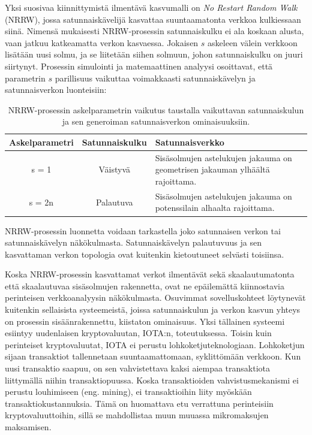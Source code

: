 \documentclass[finnish, 12pt, a4paper, sci, utf8, pdfa]{aaltothesis}
\begin{document}
Yksi suosivaa kiinnittymistä ilmentävä kasvumalli on \textit{No Restart Random Walk} (NRRW), jossa satunnaiskävelijä kasvattaa suuntaamatonta verkkoa kulkiessaan siinä. Nimensä 
mukaisesti NRRW-prosessin satunnaiskulku ei ala koskaan alusta, vaan jatkuu katkeamatta verkon kasvaessa. Jokaisen $ s $ askeleen välein verkkoon lisätään uusi solmu, ja se liitetään siihen solmuun, johon satunnaiskulku on juuri siirtynyt. Prosessin simulointi ja matemaattinen analyysi osoittavat, että parametrin $ s $ parillisuus vaikuttaa voimakkaasti satunnaiskävelyn ja satunnaisverkon luonteisiin:
\begin{table}[htb]
   \begin{center}
   \begin{tabular}{|c|c|p{7.5cm}|}
   \hline
   \textbf{Askelparametri} & \textbf{Satunnaiskulku} & \textbf{Satunnaisverkko} \\ \hline
   s = 1          & Väistyvä        & Sisäsolmujen astelukujen jakauma on geometrisen jakauman ylhäältä rajoittama. \\ \hline
   s = 2n         & Palautuva       & Sisäsolmujen astelukujen jakauma on potenssilain alhaalta rajoittama. \\ \hline
   \end{tabular}
   \end{center}
   \caption{NRRW-prosessin askelparametrin vaikutus taustalla vaikuttavan satunnaiskulun ja sen generoiman satunnaisverkon ominaisuuksiin.}
   \label{table:nrrw-character}
\end{table}

NRRW-prosessin luonnetta voidaan tarkastella joko satunnaisen verkon tai satunnaiskävelyn näkökulmasta. Satunnaiskävelyn palautuvuus ja sen kasvattaman verkon topologia ovat 
kuitenkin kietoutuneet selvästi toisiinsa. \cite{Iacobelli}

Koska NRRW-prosessin kasvattamat verkot ilmentävät sekä skaalautumatonta että skaalautuvaa sisäsolmujen rakennetta, ovat ne epäilemättä kiinnostavia perinteisen verkkoanalyysin näkökulmasta. 
Osuvimmat sovelluskohteet löytynevät kuitenkin sellaisista systeemeistä, joissa satunnaiskulun ja verkon kasvun yhteys on prosessin sisäänrakennettu, kiistaton ominaisuus. Yksi tällainen
systeemi esiintyy uudenlaisen kryptovaluutan, IOTA:n, toteutuksessa. Toisin kuin perinteiset kryptovaluutat, IOTA ei perustu lohkoketjuteknologiaan. Lohkoketjun sijaan transaktiot 
tallennetaan suuntaamattomaan, syklittömään verkkoon. Kun uusi transaktio saapuu, on sen vahvistettava kaksi aiempaa transaktiota liittymällä niihin transaktiopuussa. Koska 
transaktioiden vahvistusmekanismi ei perustu louhimiseen (eng. mining), ei transaktioihin liity myöskään transaktiokustannuksia. Tämä on huomattava etu verrattuna perinteisiin
kryptovaluuttoihin, sillä se mahdollistaa muun muuassa mikromaksujen maksamisen. \cite{Popov-WP}
\end{document}
